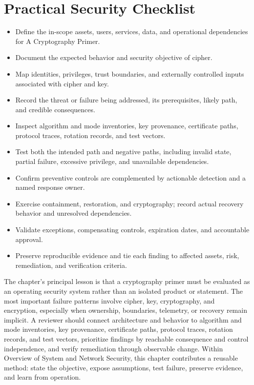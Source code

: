 \documentclass[11pt]{article}
\begin{document}
\section*{Practical Security Checklist}
\begin{itemize}[label=$\square$]
\item Define the in-scope assets, users, services, data, and operational dependencies for A Cryptography Primer.
\item Document the expected behavior and security objective of cipher.
\item Map identities, privileges, trust boundaries, and externally controlled inputs associated with cipher and key.
\item Record the threat or failure being addressed, its prerequisites, likely path, and credible consequences.
\item Inspect algorithm and mode inventories, key provenance, certificate paths, protocol traces, rotation records, and test vectors.
\item Test both the intended path and negative paths, including invalid state, partial failure, excessive privilege, and unavailable dependencies.
\item Confirm preventive controls are complemented by actionable detection and a named response owner.
\item Exercise containment, restoration, and cryptography; record actual recovery behavior and unresolved dependencies.
\item Validate exceptions, compensating controls, expiration dates, and accountable approval.
\item Preserve reproducible evidence and tie each finding to affected assets, risk, remediation, and verification criteria.
\end{itemize}
\begin{synthesisbox}
The chapter's principal lesson is that a cryptography primer must be evaluated as an operating security system rather than an isolated product or statement. The most important failure patterns involve cipher, key, cryptography, and encryption, especially when ownership, boundaries, telemetry, or recovery remain implicit. A reviewer should connect architecture and behavior to algorithm and mode inventories, key provenance, certificate paths, protocol traces, rotation records, and test vectors, prioritize findings by reachable consequence and control independence, and verify remediation through observable change. Within Overview of System and Network Security, this chapter contributes a reusable method: state the objective, expose assumptions, test failure, preserve evidence, and learn from operation.
\end{synthesisbox}
\end{document}
